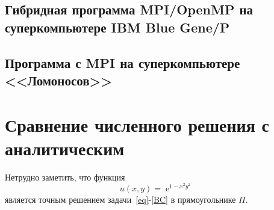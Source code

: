 \documentclass[11pt]{article}
\numberwithin{equation}{section}
\theoremstyle{plain}
\theoremstyle{definition}
\DeclareMathOperator{\expon}{e}
\begin{document}
\subsection{Гибридная программа MPI/OpenMP на суперкомпьютере IBM Blue Gene/P}
\subsection{Программа с MPI на суперкомпьютере <<Ломоносов>>}

\section{Сравнение численного решения с аналитическим}
Нетрудно заметить, что функция
\[u(x,y)=\expon^{1-x^2y^2}\]
является точным решением задачи~\eqref{eq}-\eqref{BC} в прямоугольнике \(\Pi.\)
\end{document}
